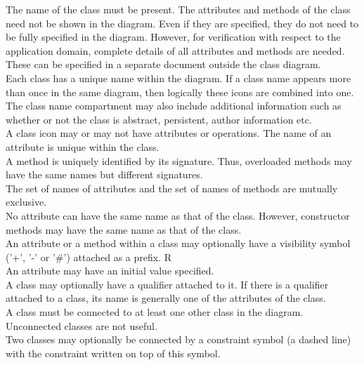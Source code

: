 The name of the class must be present. The attributes and methods of the class need not be shown in the diagram. Even if they are specified, they do not need to be fully specified in the diagram. However, for verification with respect to the application domain, complete details of all attributes and methods are needed. These can be specified in a separate document outside the class diagram.\\
Each class has a unique name within the diagram.  If a class name appears more than once in the same diagram, then logically these icons are combined into one.\\
The class name compartment may also include additional information such as whether or not the class is abstract, persistent, author information etc. \\
 A class icon may or may not have attributes or operations.
 The name of an attribute is unique within the class.\\
 A method is uniquely identified by its signature. Thus, overloaded methods may have the same names but different signatures.\\
 The set of names of attributes and the set of names of methods are mutually exclusive.\\
 No attribute can have the same name as that of the class. However, constructor methods may have the same name as that of the class.\\
 An attribute or a method within a class may optionally have a visibility symbol ('+', '-' or '\#') attached as a prefix. R\\
An attribute may have an initial value specified.\\
 A class may optionally have a qualifier attached to it. If there is a qualifier attached to a class, its name is generally one of the attributes of the class.\\
A class must be connected to at least one other class in the diagram. Unconnected classes are not useful.\\
Two classes may optionally be connected by a constraint symbol (a dashed line) with the constraint written on top of this symbol.

